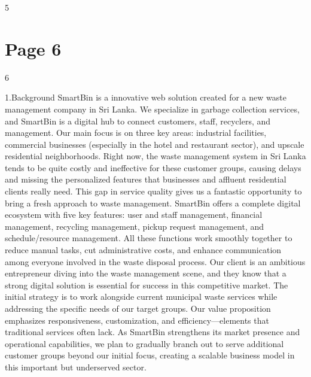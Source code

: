 \documentclass{article}
\begin{document}
 
 5  
 
 
 
 
 
 
 
 
 
 
 
 
 
 
 
 
 
 
 
 
 
 
 
 
 

\section*{Page 6}
   
 
 6  
 
1.Background 
SmartBin is a innovative web solution created for a new waste management company in Sri 
Lanka. We specialize in garbage collection services, and SmartBin is a digital hub to connect 
customers, staff, recyclers, and management. Our main focus is on three key areas: industrial 
facilities, commercial businesses (especially in the hotel and restaurant sector), and upscale 
residential neighborhoods. 
Right now, the waste management system in Sri Lanka tends to be quite costly and ineffective 
for these customer groups, causing delays and missing the personalized features that 
businesses and affluent residential clients really need. This gap in service quality gives us a 
fantastic opportunity to bring a fresh approach to waste management. 
SmartBin offers a complete digital ecosystem with five key features: user and staff 
management, financial management, recycling management, pickup request management, and 
schedule/resource management. All these functions work smoothly together to reduce manual 
tasks, cut administrative costs, and enhance communication among everyone involved in the 
waste disposal process. 
Our client is an ambitious entrepreneur diving into the waste management scene, and they 
know that a strong digital solution is essential for success in this competitive market. The initial 
strategy is to work alongside current municipal waste services while addressing the specific 
needs of our target groups. Our value proposition emphasizes responsiveness, customization, 
and efficiency—elements that traditional services often lack. As SmartBin strengthens its 
market presence and operational capabilities, we plan to gradually branch out to serve 
additional customer groups beyond our initial focus, creating a scalable business model in this 
important but underserved sector. 
 
\end{document}
